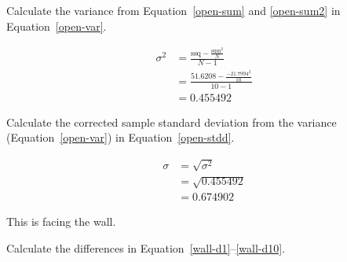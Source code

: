 \documentclass[twocolumn]{article}
\begin{document}
Calculate the variance from Equation~\ref{open-sum} and \ref{open-sum2} in Equation~\ref{open-var}.

\begin{align}
\sigma^{2} &= \frac{\text{ssq} - \frac{\text{sum}^{2}}{N}}{N-1} \nonumber\\
 &= \frac{51.6208 - \frac{-21.7994^2}{10}}{10-1} \nonumber\\
 &= 0.455492 \label{open-var}
\end{align}

Calculate the corrected sample standard deviation from the variance (Equation~\ref{open-var}) in Equation~\ref{open-stdd}.

\begin{align}
\sigma &= \sqrt{\sigma^{2}} \nonumber\\
 &= \sqrt{0.455492} \nonumber\\
 &= 0.674902 \label{open-stdd}
\end{align}

This is facing the wall.

Calculate the differences in Equation~\ref{wall-d1}--\ref{wall-d10}.
\end{document}
